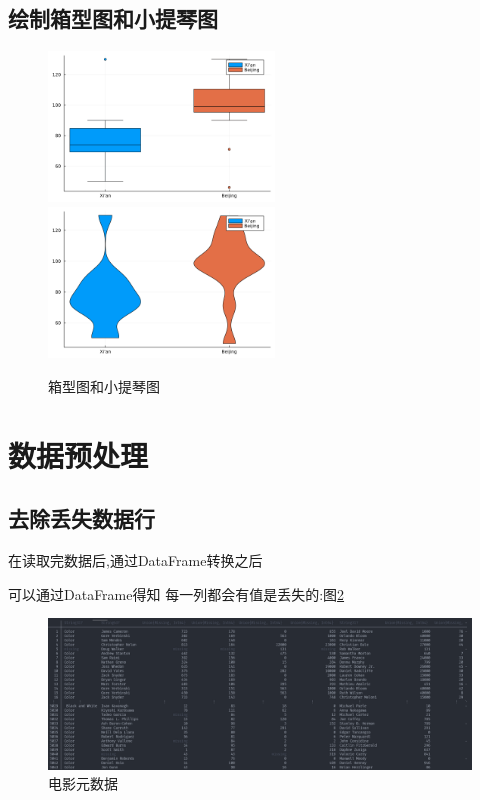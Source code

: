 \documentclass[a4paper]{article}
\begin{document}
\subsection{绘制箱型图和小提琴图} \label{sub:violin-box}
\begin{figure}[h]
    \centering
    \includegraphics[width=6cm]{images/box.png}
    \includegraphics[width=6cm]{images/violin.png}
    \caption{箱型图和小提琴图}
    \label{fig:violin_box}
\end{figure}

\newpage

\section{数据预处理}\label{sub:pre_process}
\subsection{去除丢失数据行} \label{sub:pre_process-lab}

在读取完数据后,通过DataFrame转换之后

可以通过DataFrame得知
每一列都会有值是丢失的:图\ref{fig:movie_metadata}

\begin{figure}[h]
    \centering
    \includegraphics[width=12cm]{movie-metadata.png}
    \caption{电影元数据}
    \label{fig:movie_metadata}
\end{figure}
\end{document}
